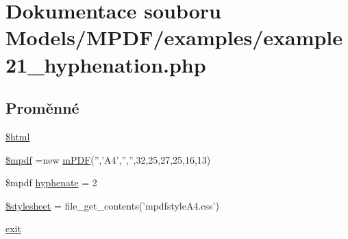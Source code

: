 \hypertarget{example21__hyphenation_8php}{\section{Dokumentace souboru Models/\-M\-P\-D\-F/examples/example21\-\_\-hyphenation.php}
\label{example21__hyphenation_8php}
}
\subsection*{Proměnné}
\begin{DoxyCompactItemize}
\item 
\hyperlink{example21__hyphenation_8php_a6f96e7fc92441776c9d1cd3386663b40}{\$html}
\item 
\hyperlink{example21__hyphenation_8php_ad028f81910d6cbab9b184d2214b3a8f8}{\$mpdf} =new \hyperlink{classm_p_d_f}{m\-P\-D\-F}('','A4','','',32,25,27,25,16,13)
\item 
\$mpdf \hyperlink{example21__hyphenation_8php_a988e0360138a1001f27d70c65256d100}{hyphenate} = 2
\item 
\hyperlink{example21__hyphenation_8php_a19e5cf73e817c55a49205e6ec78c88a8}{\$stylesheet} = file\-\_\-get\-\_\-contents('mpdfstyle\-A4.\-css')
\item 
\hyperlink{example21__hyphenation_8php_a6733eb5f605d09eaede9845835d71c4e}{exit}
\end{DoxyCompactItemize}


